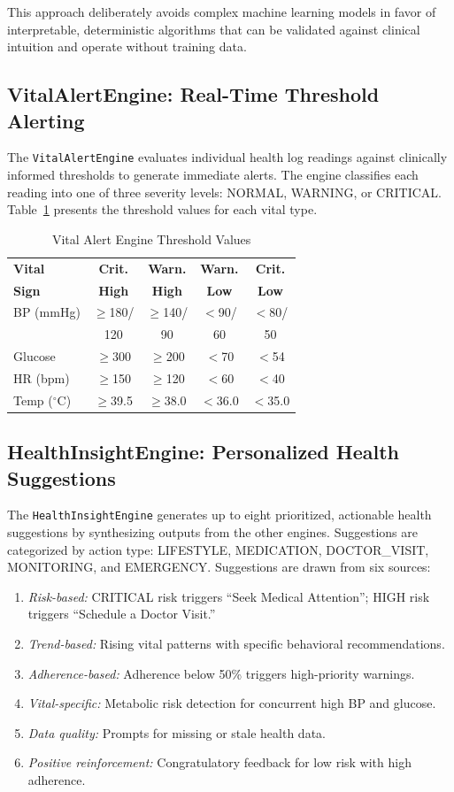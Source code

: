\documentclass[journal,onecolumn,web]{ieeecolor}
\begin{document}
This approach deliberately avoids complex machine
learning models in favor of interpretable,
deterministic algorithms that can be validated against
clinical intuition and operate without training data.

\subsection{VitalAlertEngine: Real-Time Threshold
Alerting}
The {\tt VitalAlertEngine} evaluates individual health
log readings against clinically informed thresholds to
generate immediate alerts. The engine classifies each
reading into one of three severity levels: NORMAL,
WARNING, or CRITICAL. Table~\ref{tab:vitalalerts}
presents the threshold values for each vital type.

\begin{table}[!t]
\caption{Vital Alert Engine Threshold Values}
\label{tab:vitalalerts}
\centering\small
\begin{tabular}{l c c c c}
\toprule
{\bf Vital} & {\bf Crit.} & {\bf Warn.}
& {\bf Warn.} & {\bf Crit.} \\
{\bf Sign} & {\bf High} & {\bf High}
& {\bf Low} & {\bf Low} \\
\midrule
BP (mmHg) & $\geq$180/ & $\geq$140/
& $<$90/ & $<$80/ \\
& 120 & 90 & 60 & 50 \\
Glucose & $\geq$300 & $\geq$200
& $<$70 & $<$54 \\
HR (bpm) & $\geq$150 & $\geq$120
& $<$60 & $<$40 \\
Temp ($^\circ$C) & $\geq$39.5 & $\geq$38.0
& $<$36.0 & $<$35.0 \\
\bottomrule
\end{tabular}
\end{table}

\subsection{HealthInsightEngine: Personalized Health
Suggestions}
The {\tt HealthInsightEngine} generates up to eight
prioritized, actionable health suggestions by
synthesizing outputs from the other engines.
Suggestions are categorized by action type: LIFESTYLE,
MEDICATION, DOCTOR\_VISIT, MONITORING, and EMERGENCY.
Suggestions are drawn from six sources:

\begin{enumerate}
\item {\it Risk-based:} CRITICAL risk triggers ``Seek
Medical Attention''; HIGH risk triggers ``Schedule a
Doctor Visit.''
\item {\it Trend-based:} Rising vital patterns with
specific behavioral recommendations.
\item {\it Adherence-based:} Adherence below 50\%
triggers high-priority warnings.
\item {\it Vital-specific:} Metabolic risk detection
for concurrent high BP and glucose.
\item {\it Data quality:} Prompts for missing or
stale health data.
\item {\it Positive reinforcement:} Congratulatory
feedback for low risk with high adherence.
\end{enumerate}
\end{document}
